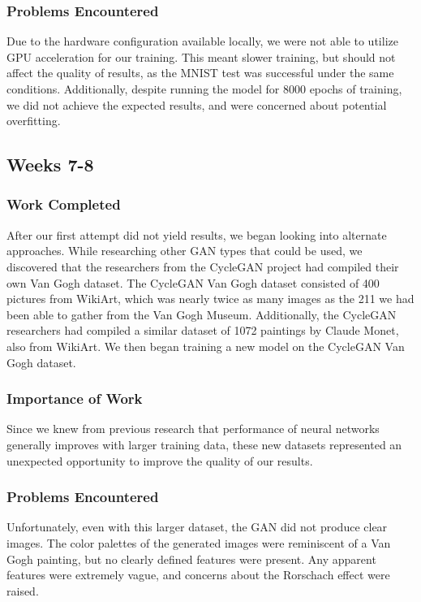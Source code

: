 \documentclass[12pt,letterpaper]{article}
\begin{document}
	\subsubsection{Problems Encountered}
	Due to the hardware configuration available locally, we were not able to utilize GPU acceleration for our training.
	This meant slower training, but should not affect the quality of results, as the MNIST test was successful under the same conditions.
	Additionally, despite running the model for 8000 epochs of training, we did not achieve the expected results, and were concerned about potential overfitting.

	\subsection{Weeks 7-8}
	\subsubsection{Work Completed}
	After our first attempt did not yield results, we began looking into alternate approaches.
	While researching other GAN types that could be used, we discovered that the researchers from the CycleGAN\cite{CycleGAN2017}\cite{isola2017image} project had compiled their own Van Gogh dataset.
	The CycleGAN Van Gogh dataset consisted of 400 pictures from WikiArt\cite{wikiartVanGogh}, which was nearly twice as many images as the 211 we had been able to gather from the Van Gogh Museum.
	Additionally, the CycleGAN researchers had compiled a similar dataset of 1072 paintings by Claude Monet, also from WikiArt.
	We then began training a new model on the CycleGAN Van Gogh dataset.
	\subsubsection{Importance of Work}
	Since we knew from previous research that performance of neural networks generally improves with larger training data, these new datasets represented an unexpected opportunity to improve the quality of our results.
	\subsubsection{Problems Encountered}
	Unfortunately, even with this larger dataset, the GAN did not produce clear images.
	The color palettes of the generated images were reminiscent of a Van Gogh painting, but no clearly defined features were present.
	Any apparent features were extremely vague, and concerns about the Rorschach effect were raised.
\end{document}
